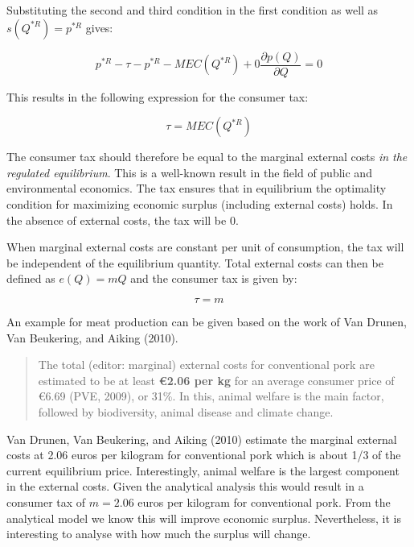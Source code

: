 \documentclass[
]{book}
\begin{document}
Substituting the second and third condition in the first condition as well as \(s(Q^{\ast R}) =p^{*R}\) gives:

\begin{equation}
p^{*R} - \tau - p^{*R} - MEC(Q^{* R}) + 0 \frac{\partial p(Q)}{\partial Q} = 0
\end{equation}

This results in the following expression for the consumer tax:

\begin{equation}
\tau = MEC(Q^{* R})
\end{equation}

The consumer tax should therefore be equal to the marginal external costs \emph{in the regulated equilibrium}. This is a well-known result in the field of public and environmental economics. The tax ensures that in equilibrium the optimality condition for maximizing economic surplus (including external costs) holds. In the absence of external costs, the tax will be \(0\).

When marginal external costs are constant per unit of consumption, the tax will be independent of the equilibrium quantity. Total external costs can then be defined as \(e(Q)=mQ\) and the consumer tax is given by:

\begin{equation}
\tau = m
\end{equation}

An example for meat production can be given based on the work of Van Drunen, Van Beukering, and Aiking (2010).

\begin{quote}
The total (editor: marginal) external costs for conventional pork are estimated to be at least \textbf{€2.06 per kg} for an average consumer price of €6.69 (PVE, 2009), or 31\%. In this, animal welfare is the main factor, followed by biodiversity, animal disease and climate change.
\end{quote}

Van Drunen, Van Beukering, and Aiking (2010) estimate the marginal external costs at 2.06 euros per kilogram for conventional pork which is about 1/3 of the current equilibrium price. Interestingly, animal welfare is the largest component in the external costs. Given the analytical analysis this would result in a consumer tax of \(m=2.06\) euros per kilogram for conventional pork. From the analytical model we know this will improve economic surplus. Nevertheless, it is interesting to analyse with how much the surplus will change.
\end{document}
